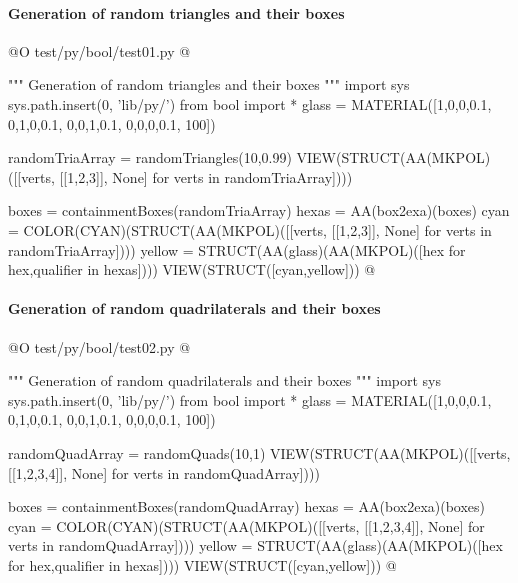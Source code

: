 \documentclass[11pt,oneside]{article}    %
\begin{document}
\paragraph{Generation of random triangles and their boxes}
@O test/py/bool/test01.py
@{""" Generation of random triangles and their boxes """
import sys
sys.path.insert(0, 'lib/py/')
from bool import *
glass = MATERIAL([1,0,0,0.1,  0,1,0,0.1,  0,0,1,0.1, 0,0,0,0.1, 100])

randomTriaArray = randomTriangles(10,0.99)
VIEW(STRUCT(AA(MKPOL)([[verts, [[1,2,3]], None] for verts in randomTriaArray])))

boxes = containmentBoxes(randomTriaArray)
hexas = AA(box2exa)(boxes)
cyan = COLOR(CYAN)(STRUCT(AA(MKPOL)([[verts, [[1,2,3]], None] for verts in randomTriaArray])))
yellow = STRUCT(AA(glass)(AA(MKPOL)([hex for hex,qualifier in hexas])))
VIEW(STRUCT([cyan,yellow]))
@}


\paragraph{Generation of random quadrilaterals and their boxes}
@O test/py/bool/test02.py
@{""" Generation of random quadrilaterals and their boxes """
import sys
sys.path.insert(0, 'lib/py/')
from bool import *
glass = MATERIAL([1,0,0,0.1,  0,1,0,0.1,  0,0,1,0.1, 0,0,0,0.1, 100])

randomQuadArray = randomQuads(10,1)
VIEW(STRUCT(AA(MKPOL)([[verts, [[1,2,3,4]], None] for verts in randomQuadArray])))

boxes = containmentBoxes(randomQuadArray)
hexas = AA(box2exa)(boxes)
cyan = COLOR(CYAN)(STRUCT(AA(MKPOL)([[verts, [[1,2,3,4]], None] for verts in randomQuadArray])))
yellow = STRUCT(AA(glass)(AA(MKPOL)([hex for hex,qualifier in hexas])))
VIEW(STRUCT([cyan,yellow]))
@}
\end{document}
